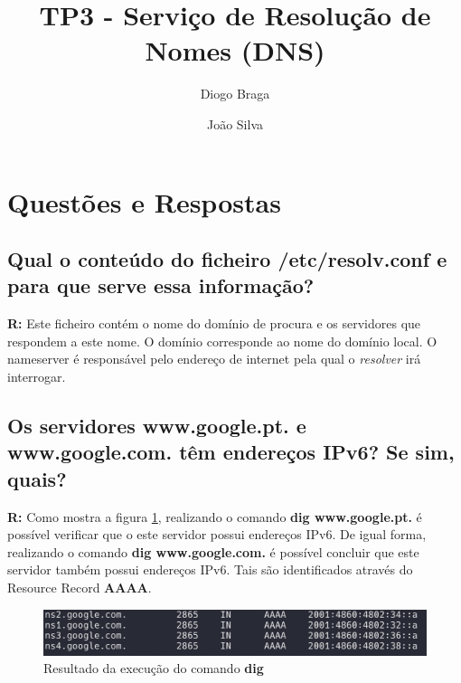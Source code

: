 \documentclass{llncs}
\begin{document}
\mainmatter
\title{TP3 - Serviço de Resolução de Nomes (DNS)}


\author{Diogo Braga \and João Silva}



\date{}


\maketitle

\section{Questões e Respostas}

\subsection{\textbf{Qual o conteúdo do ficheiro /etc/resolv.conf e para que serve essa informação?}}
\textbf{R:} Este ficheiro contém o nome do domínio de procura e os servidores que respondem a este nome. O domínio corresponde ao nome do domínio local. O nameserver é responsável pelo endereço de internet pela qual o \textit{resolver} irá interrogar.

\subsection{\textbf{Os servidores www.google.pt. e www.google.com. têm endereços IPv6? Se sim, quais?}}
\textbf{R:} Como mostra a figura \ref{fig:1b}, realizando o comando \textbf{dig www.google.pt.} é possível verificar que o este servidor possui endereços IPv6. De igual forma, realizando o comando \textbf{dig www.google.com.} é possível concluir que este servidor também possui endereços IPv6. Tais são identificados através do Resource Record \textbf{AAAA}.


\begin{figure}[H]
\begin{center}
\includegraphics[scale=0.4]{1b.png}
\end{center}
\caption{\label{fig:1b}Resultado da execução do comando \textbf{dig}}
\end{figure}
\end{document}
